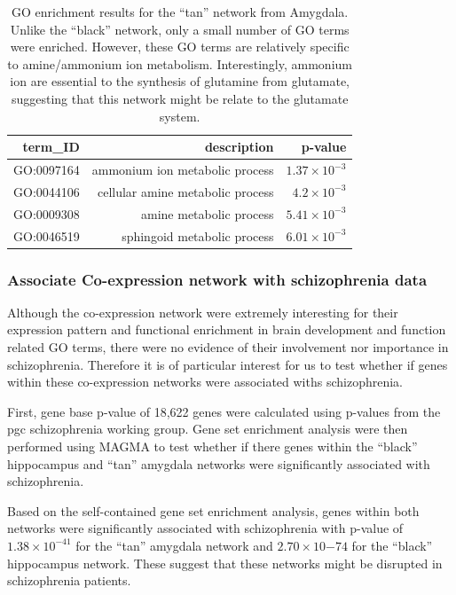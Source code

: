 \documentclass{book}
\begin{document}
	\begin{table}[h]
		\centering
		\caption[ enrichment results for the ``tan'' network from Amygdala]{\gls{GO} enrichment results for the ``tan'' network from Amygdala.
			Unlike the ``black'' network, only a small number of \gls{GO} terms were enriched. 
			However, these \gls{GO} terms are relatively specific to amine/ammonium ion metabolism.
			Interestingly, ammonium ion are essential to the synthesis of glutamine from glutamate, suggesting that this network might be relate to the glutamate system.
			}
		\begin{tabular}{rrr}
				\toprule
				term\_ID & description & p-value \\
				\midrule
				GO:0097164 & ammonium ion metabolic process & $1.37\times 10^{-3}$ \\
				GO:0044106 & cellular amine metabolic process & $4.2\times 10^{-3}$ \\
				GO:0009308 & amine metabolic process & $5.41\times 10^{-3}$ \\
				GO:0046519 & sphingoid metabolic process & $6.01\times 10^{-3}$ \\
				\bottomrule
		\end{tabular}%
		\label{tab:tanGO}%
	\end{table}%

	\subsubsection{Associate Co-expression network with  schizophrenia data}
	Although the co-expression network were extremely interesting for their expression pattern and functional enrichment in brain development and function related \gls{GO} terms, there were no evidence of their involvement nor importance in schizophrenia.
	Therefore it is of particular interest for us to test whether if genes within these co-expression networks were associated withs schizophrenia. 
	
	First, gene base p-value of 18,622 genes were calculated using p-values from the \gls{pgc} schizophrenia working group\citep{Ripke2014}.
	Gene set enrichment analysis were then performed using \gls{MAGMA}\citep{DeLeeuw2015} to test whether if there genes within the ``black'' hippocampus and ``tan'' amygdala networks were significantly associated with schizophrenia.
	
	Based on the self-contained gene set enrichment analysis, genes within both networks were significantly associated with schizophrenia with p-value of $1.38\times 10^{-41}$ for the ``tan'' amygdala network and $2.70\times 10{-74}$ for the ``black'' hippocampus network.
	These suggest that these networks might be disrupted in schizophrenia patients.
	
\end{document}
